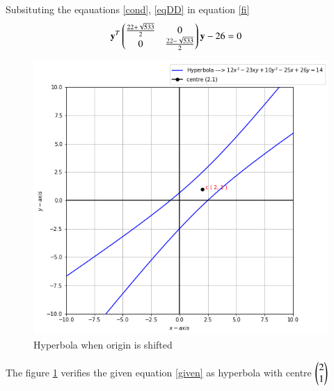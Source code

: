 \documentclass[journal,12pt,twocolumn]{IEEEtran}
\begin{document}
Subsituting the eqauations \eqref{cond}, \eqref{eqDD} in equation \eqref{fi}
\begin{align}
    \mathbf{y}^T\begin{pmatrix}\frac{22+\sqrt{533}}{2} & 0\\0 & \frac{22-\sqrt{533}}{2}\end{pmatrix}\mathbf{y}-26&=0
\end{align}
\renewcommand{\thefigure}{1}
\begin{figure}[h]
    \centering
    \includegraphics[width=\columnwidth]{Assignment 8.png}
    \caption{Hyperbola when origin is shifted}
    \label{Fig :1}
\end{figure}

The figure \ref{Fig :1} verifies the given equation \eqref{given} as hyperbola with centre $\begin{pmatrix}2\\1\end{pmatrix}$
\end{document}
